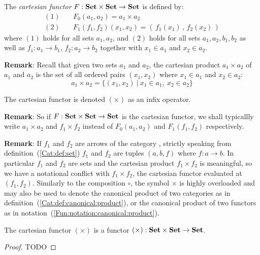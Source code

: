 \begin{defin}\label{Fun:def:cartesian}
    The {\em cartesian functor} $F:\mbox{\bf Set}\times\mbox{\bf Set}\to\mbox{\bf Set}$ is defined by:
        \begin{eqnarray*}
            (1)&\ &F_{0}(a_{1},a_{2}) = a_{1}\times a_{2}\\
            (2)&\ &F_{1}(f_{1},f_{2})(x_{1},x_{2})
                =(\,f_{1}(x_{1})\,,\,f_{2}(x_{2})\,)
        \end{eqnarray*}
    where $(1)$ holds for all sets $a_{1},a_{2}$, and $(2)$ holds for all
    sets $a_{1},a_{2},b_{1},b_{2}$ as well as $f_{1}:a_{1}\to b_{1}$, 
    $f_{2}:a_{2}\to b_{2}$ together with $x_{1}\in a_{1}$ and $x_{2}\in a_{2}$.
\end{defin}

\noindent
{\bf Remark}: Recall that given two sets $a_{1}$ and $a_{2}$, the cartesian
product $a_{1}\times a_{2}$ of $a_{1}$ and $a_{2}$ is the set of all
ordered pairs $(x_{1},x_{2})$ where $x_{1}\in a_{1}$ and $x_{2}\in a_{2}$:
    \[
    a_{1}\times a_{2}=\{(x_{1},x_{2})\ |\ x_{1}\in a_{1},\ x_{2}\in a_{2}\}
    \]

\begin{notation}\label{Fun:notation:cartesian}
    The cartesian functor is denoted $(\times)$ as an infix operator.
\end{notation}

\noindent
{\bf Remark}: So if $F:\mbox{\bf Set}\times\mbox{\bf Set}\to\mbox{\bf Set}$ is the cartesian functor, we 
shall typicallly write $a_{1}\times a_{2}$ and $f_{1}\times f_{2}$ instead
of $F_{0}(a_{1},a_{2})$ and $F_{1}(f_{1},f_{2})$ respectively.

{\bf Remark}: If $f_{1}$ and $f_{2}$ are arrows of the category \Set, strictly
speaking from definition~(\ref{Cat:def:set}) $f_{1}$ and $f_{2}$ are tuples
$(a,b,f)$ where $f:a\to b$. In particular $f_{1}$ and $f_{2}$ are sets and
the cartesian product $f_{1}\times f_{2}$ is meaningful, so we have a 
notational conflict with $f_{1}\times f_{2}$, the cartesian
functor evaluated at $(f_{1},f_{2})$. Similarly to the composition $\circ$, 
the symbol $\times$ is highly overloaded and may also be used to denote the 
canonical product of two categories as in 
definition~(\ref{Cat:def:canonical:product}), or the canonical product of
two functors as in notation~(\ref{Fun:notation:canonical:product}).

\begin{prop}\label{Fun:prop:cartesian}
    The cartesian functor $(\times)$ is a functor $(\times):\mbox{\bf Set}\times\mbox{\bf Set}
    \to\mbox{\bf Set}$. 
\end{prop}
\begin{proof}
    TODO
\end{proof}
